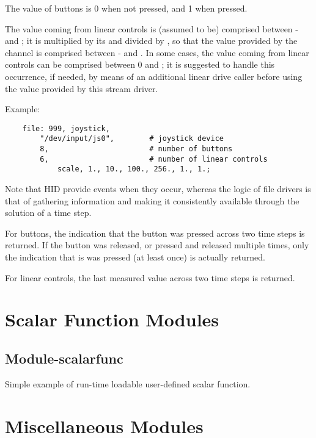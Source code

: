 The value of buttons is 0 when not pressed, and 1 when pressed.

The value coming from linear controls is (assumed to be) comprised between - and ;
it is multiplied by its  and divided by , so that the value provided by the channel
is comprised between - and .
In some cases, the value coming from linear controls can be comprised between 0 and ;
it is suggested to handle this occurrence, if needed, by means of an additional linear drive caller
before using the value provided by this stream driver.

Example:
\begin{verbatim}
    file: 999, joystick,
        "/dev/input/js0",        # joystick device
        8,                       # number of buttons
        6,                       # number of linear controls
            scale, 1., 10., 100., 256., 1., 1.;
\end{verbatim}
        
Note that HID provide events when they occur, whereas the logic of file drivers
is that of gathering information and making it consistently available through
the solution of a time step.

For buttons, the indication that the button was pressed across two time steps is returned.
If the button was released, or pressed and released multiple times,
only the indication that is was pressed (at least once) is actually returned.

For linear controls, the last measured value across two time steps is returned.





\section{Scalar Function Modules}

\subsection{Module-scalarfunc}
Simple example of run-time loadable user-defined scalar function.



\section{Miscellaneous Modules}

